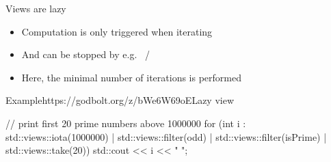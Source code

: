 \begin{frame}[fragile]
  \begin{block}{Views are lazy}
    \begin{itemize}
    \item Computation is only triggered when iterating
    \item And can be stopped by e.g.\  / 
    \item Here, the minimal number of iterations is performed
    \end{itemize}
  \end{block}
  \begin{exampleblockGB}{Example}{https://godbolt.org/z/bWe6W69oE}{Lazy view}
    \begin{cppcode*}{}
      // print first 20 prime numbers above 1000000
      for (int i : std::views::iota(1000000)
                 | std::views::filter(odd)
                 | std::views::filter(isPrime)
                 | std::views::take(20)) {
        std::cout << i << " ";
      }
    \end{cppcode*}
  \end{exampleblockGB}
\end{frame}
